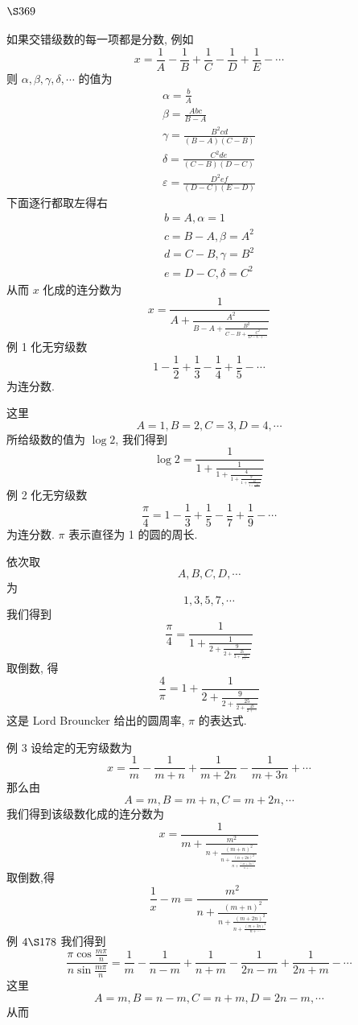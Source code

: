\section{$\S 369$}

如果交错级数的每一项都是分数, 例如
\[
x=\frac{1}{A}-\frac{1}{B}+\frac{1}{C}-\frac{1}{D}+\frac{1}{E}-\cdots
\]
则 $\alpha, \beta, \gamma, \delta, \cdots$ 的值为
\[
\begin{gathered}
\alpha=\frac{b}{A} \\
\beta=\frac{A b c}{B-A} \\
\gamma=\frac{B^{2} c d}{(B-A)(C-B)} \\
\delta=\frac{C^{2} d e}{(C-B)(D-C)} \\
\varepsilon=\frac{D^{2} e f}{(D-C)(E-D)}
\end{gathered}
\]
下面逐行都取左得右
\[
\begin{gathered}
b=A, \alpha=1 \\
c=B-A, \beta=A^{2} \\
d=C-B, \gamma=B^{2} \\
e=D-C, \delta=C^{2}
\end{gathered}
\]
从而 $x$ 化成的连分数为
\[
x=\frac{1}{A+\frac{A^{2}}{B-A+\frac{B^{2}}{C-B+\frac{C^{2}}{D-C+\cdots}}}}
\]
例 1 化无穷级数
\[
1-\frac{1}{2}+\frac{1}{3}-\frac{1}{4}+\frac{1}{5}-\cdots
\]
为连分数.

这里
\[
A=1, B=2, C=3, D=4, \cdots
\]
所给级数的值为 $\log 2$, 我们得到
\[
\log 2=\frac{1}{1+\frac{1}{1+\frac{4}{1+\frac{9}{1+\frac{16}{1+\frac{25}{1+\cdots}}}}}}
\]
例 2 化无穷级数
\[
\frac{\pi}{4}=1-\frac{1}{3}+\frac{1}{5}-\frac{1}{7}+\frac{1}{9}-\cdots
\]
为连分数. $\pi$ 表示直径为 1 的圆的周长.

依次取
\[
A, B, C, D, \cdots
\]
为
\[
1,3,5,7, \cdots
\]
我们得到
\[
\frac{\pi}{4}=\frac{1}{1+\frac{1}{2+\frac{9}{2+\frac{25}{2+\frac{49}{2+\cdots}}}}}
\]
取倒数, 得
\[
\frac{4}{\pi}=1+\frac{1}{2+\frac{9}{2+\frac{25}{2+\frac{49}{2+\cdots}}}}
\]
这是 Lord Brouncker 给出的圆周率, $\pi$ 的表达式.

例 3 设给定的无穷级数为
\[
x=\frac{1}{m}-\frac{1}{m+n}+\frac{1}{m+2 n}-\frac{1}{m+3 n}+\cdots
\]
那么由
\[
A=m, B=m+n, C=m+2 n, \cdots
\]
我们得到该级数化成的连分数为
\[
x=\frac{1}{m+\frac{m^{2}}{n+\frac{(m+n)^{2}}{n+\frac{(n+2 n)^{2}}{n+\frac{(m+3 n)^{2}}{n+\cdots}}}}}
\]
取倒数,得
\[
\frac{1}{x}-m=\frac{m^{2}}{n+\frac{(m+n)^{2}}{n+\frac{(m+2 n)^{2}}{n+\frac{(m+3 n)^{2}}{n+\cdots}}}}
\]
例 $4 \S 178$ 我们得到
\[
\frac{\pi \cos \frac{m \pi}{n}}{n \sin \frac{m \pi}{n}}=\frac{1}{m}-\frac{1}{n-m}+\frac{1}{n+m}-\frac{1}{2 n-m}+\frac{1}{2 n+m}-\cdots
\]
这里
\[
A=m, B=n-m, C=n+m, D=2 n-m, \cdots
\]
从而

